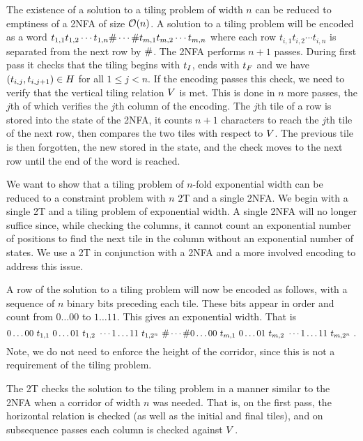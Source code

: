 The existence of a solution to a tiling problem of width $n$ can be reduced to emptiness of a 2NFA of size 
${\mathcal{O}}\mathord{\left( n \right)}$.
A solution to a tiling problem will be encoded as a word 
$t_{1,1} t_{1,2} \cdots t_{1,n} \# \cdots \# t_{m,1} t_{m,2} \cdots t_{m,n}$
where each row
$t_{i,1} t_{i,2} \cdots t_{i,n}$
is separated from the next row by $\#$.
The 2NFA performs $n+1$ passes.
During first pass it checks that the tiling begins with $t_I$, ends with $t_F$ and we have 
$\left( t_{i,j}, t_{i,j+1} \right) \in H$
for all
$1 \leq j < n$.
If the encoding passes this check, we need to verify that the vertical tiling relation $V$ is met.
This is done in $n$ more passes, the $j$th of which verifies the $j$th column of the encoding.
The $j$th tile of a row is stored into the state of the 2NFA, it counts $n+1$ characters to reach the $j$th tile of the next row, then compares the two tiles with respect to $V$.
The previous tile is then forgotten, the new stored in the state, and the check moves to the next row until the end of the word is reached.

We want to show that a tiling problem of $n$-fold exponential width can be reduced to a constraint problem with $n$ 2T and a single 2NFA.
We begin with a single 2T and a tiling problem of exponential width.
A single 2NFA will no longer suffice since, while checking the columns, it cannot count an exponential number of positions to find the next tile in the column without an exponential number of states.
We use a 2T in conjunction with a 2NFA and a more involved encoding to address this issue.

A row of the solution to a tiling problem will now be encoded as follows, with a sequence of $n$ binary bits preceding each tile.
These bits appear in order and count from $0\ldots00$ to $1\ldots11$.
This gives an exponential width.
That is
\[
    0\ldots00\ \tile_{1,1}\ %
    0\ldots01\ \tile_{1,2}\ %
    \cdots
    1\ldots11\ \tile_{1,2^n}\ %
    \numsep
    \cdots
    \numsep
    0\ldots00\ \tile_{m,1}\ %
    0\ldots01\ \tile_{m,2}\ %
    \cdots
    1\ldots11\ \tile_{m,2^n} \ .
\]
Note, we do not need to enforce the height of the corridor, since this is not a requirement of the tiling problem.

The 2T checks the solution to the tiling problem in a manner similar to the 2NFA when a corridor of width $n$ was needed.
That is, on the first pass, the horizontal relation is checked (as well as the initial and final tiles), and on subsequence passes each column is checked against $V$.

